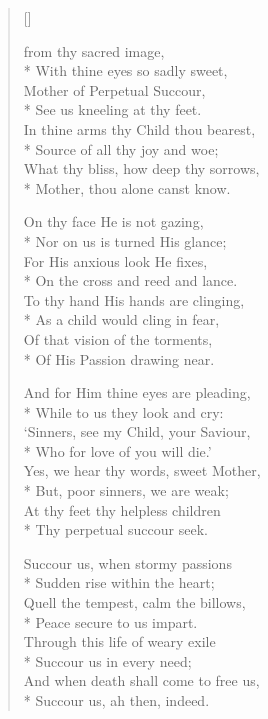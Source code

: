 \newHymn


\begin{verse}[\versewidth]

 from thy sacred image,\\*
With thine eyes so sadly sweet,\\
Mother of Perpetual Succour,\\*
See us kneeling at thy feet.\\
In thine arms thy Child thou bearest,\\*
Source of all thy joy and woe;\\
What thy bliss, how deep thy sorrows,\\*
Mother, thou alone canst know.

 On thy face He is not gazing,\\*
Nor on us is turned His glance;\\
For His anxious look He fixes,\\*
On the cross and reed and lance.\\
To thy hand His hands are clinging,\\*
As a child would cling in fear,\\
Of that vision of the torments,\\*
Of His Passion drawing near.

 And for Him thine eyes are pleading,\\*
While to us they look and cry:\\
`Sinners, see my Child, your Saviour,\\*
Who for love of you will die.'\\
Yes, we hear thy words, sweet Mother,\\*
But, poor sinners, we are weak;\\
At thy feet thy helpless children\\*
Thy perpetual succour seek.

 Succour us, when stormy passions\\*
Sudden rise within the heart;\\
Quell the tempest, calm the billows,\\*
Peace  secure to us impart.\\
Through this life of weary exile\\*
Succour us in every need;\\
And when death shall come to free us,\\*
Succour us, ah then, indeed. 

\end{verse}

